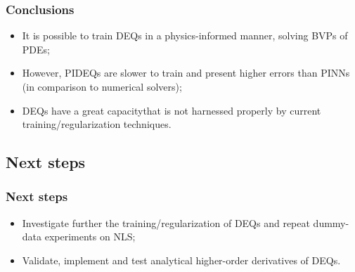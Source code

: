\documentclass[t]{beamer}
\begin{document}
\begin{frame}
    \frametitle{Conclusions}
    \begin{itemize}[label={\textbullet}]
        \item<1-> It is possible to train DEQs in a physics-informed manner, solving BVPs of PDEs;
	\item<2-> However, PIDEQs are slower to train and present higher errors than PINNs (in comparison to numerical solvers);
	\item<3-> DEQs have a great capacity\footnotemark that is not harnessed properly by current training/regularization techniques.
    \end{itemize}
\end{frame}

\subsection{Next steps}

\begin{frame}
    \frametitle{Next steps}
    \begin{itemize}[label={\textbullet}]
	\item<1-> Investigate further the training/regularization of DEQs and repeat dummy-data experiments on NLS;
	\item<2-> Validate, implement and test analytical higher-order derivatives of DEQs.
    \end{itemize}
\end{frame}
\end{document}
